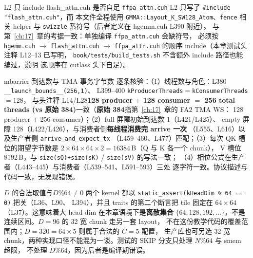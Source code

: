 \begin{kaogu}[F1·依赖关系核校通过]{L2 只 include flash\_attn.cuh 是否自足}
  \texttt{ffpa\_\allowbreak{}attn.\allowbreak{}cuh} L2 只写了 \texttt{\#include "flash\_\allowbreak{}attn.\allowbreak{}cuh"}，而
  本文件全程使用 \texttt{GMMA::\allowbreak{}Layout\_\allowbreak{}K\_\allowbreak{}SW128\_\allowbreak{}Atom}、\texttt{fence} 相关
  helper 与 \texttt{swizzle} 系符号（后者定义在 hgemm.cuh L390 附近）。
  与第~\ref{ch:17}~章的考据一致：单独编译 \texttt{ffpa\_\allowbreak{}attn.\allowbreak{}cuh} 会缺符号，
  必须按 \texttt{hgemm.cuh} $\to$ \texttt{flash\_\allowbreak{}attn.\allowbreak{}cuh} $\to$
  \texttt{ffpa\_\allowbreak{}attn.\allowbreak{}cuh} 的顺序 include（本章测试头注释 L12--13 已写明，
  \texttt{book/\allowbreak{}tests/\allowbreak{}build\_\allowbreak{}tests.\allowbreak{}sh} 不含额外 include 路径也能编过，说明
  该顺序在 cutlass 头下自足）。
\end{kaogu}

\begin{kaogu}[F2/F3·协议计数核校通过]{mbarrier 到达数与 TMA 事务字节数}
  逐条核验：（1）线程数与角色：L380 \texttt{\_\_launch\_}\allowbreak\texttt{bounds\_\allowbreak{}\_\allowbreak{}(256,\allowbreak{}1)}、
  L399--400 \texttt{k\allowbreak{}Producer\allowbreak{}Threads}$=$\texttt{k\allowbreak{}Consumer\allowbreak{}Threads}$=$128，
  与头注释 L14/L28\textbf{128 producer $+$ 128 consumer $=$ 256 total threads
  (vs 原始 384)}一致（\textbf{原始 384}指第~\ref{ch:17}~章的 FA2 TMA WS：
  128 producer $+$ 256 consumer）；（2）full 屏障初始到达数 1（L421/L425）、
  empty 屏障 128（L422/L426），与消费者侧\textbf{每线程消费完 arrive 一次}
  （L555、L616）以及生产者侧 \texttt{arrive\_\allowbreak{}and\_\allowbreak{}expect\_\allowbreak{}tx}
  （L459--460、L477）匹配；（3）每次 QK 槽位的期望字节数是
  $2 \times 64 \times 64 \times 2 = 16384$\,B（Q 与 K 各一个 chunk），
  V 槽位 $8192$\,B，与 \texttt{size\allowbreak{}(s\allowbreak{}Q)+size\allowbreak{}(s\allowbreak{}K)} / \texttt{size(sV)} 的写法一致；
  （4）相位公式在生产者（L443--445）与消费者（L539--541、L591--593）三处
  逐字符一致。协议描述与代码一致，无发现错误。
\end{kaogu}

\begin{kaogu}[F1·边界提醒]{$D$ 的合法取值与$D\%64 \ne 0$}
  两个 kernel 都以 \texttt{static\_\allowbreak{}assert\allowbreak{}(k\allowbreak{}Head\allowbreak{}Dim \% 64 =\allowbreak{}=\allowbreak{} 0)} 把关（L36、L90、
  L394），并且 traits 的第二个断言把 tile 固定在 $64\times64$
  （L37）。这意味着大 head dim 在本章语境下是\textbf{离散集合}
  $\{64, 128, 192, \ldots\}$，不是连续区间。$D{=}96$ 的 32 宽 chunk 走另一套 layout，
  不在这份教学代码的覆盖范围内；$D{=}320=64\times5$ 则属于合法的 $C{=}5$ 配置，
  生产库也可另选 32 宽 chunk，两种实现口径不能混为一谈。测试的 SKIP 分支只处理 $N\%64$ 与 smem 超限，
  不处理 $D\%64$，因为后者是编译期错误。
\end{kaogu}

